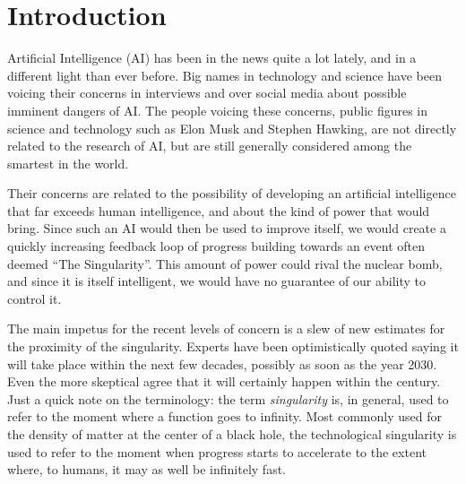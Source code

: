 \documentclass[12pt]{article} %
\begin{document}
\tableofcontents %

\newpage %


\section{Introduction} %

Artificial Intelligence (AI) has been in the news quite a lot lately, and in a different light than ever before. Big names in technology and science have been voicing their concerns in interviews and over social media about possible imminent dangers of AI. The people voicing these concerns, public figures in science and technology such as Elon Musk\cite{muskinterview} and Stephen Hawking\cite{hawkinginterview}, are not directly related to the research of AI, but are still generally considered among the smartest in the world.

Their concerns are related to the possibility of developing an artificial intelligence that far exceeds human intelligence, and about the kind of power that would bring. Since such an AI would then be used to improve itself, we would create a quickly increasing feedback loop of progress building towards an event often deemed ``The Singularity''\cite{wbw}. This amount of power could rival the nuclear bomb, and since it is itself intelligent, we would have no guarantee of our ability to control it.

The main impetus for the recent levels of concern is a slew of new estimates for the proximity of the singularity. Experts have been optimistically quoted saying it will take place within the next few decades, possibly as soon as the year 2030\cite{wbw}. Even the more skeptical agree that it will certainly happen within the century\cite{wbw}. Just a quick note on the terminology: the term \textit{singularity} is, in general, used to refer to the moment where a function goes to infinity. Most commonly used for the density of matter at the center of a black hole, the technological singularity is used to refer to the moment when progress starts to accelerate to the extent where, to humans, it may as well be infinitely fast.
\end{document}
